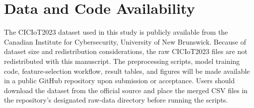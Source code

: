 \documentclass[journal]{IEEEtran}
\begin{document}
\section*{Data and Code Availability}
The CICIoT2023 dataset used in this study is publicly available from the Canadian Institute for Cybersecurity, University of New Brunswick. Because of dataset size and redistribution considerations, the raw CICIoT2023 files are not redistributed with this manuscript. The preprocessing scripts, model training code, feature-selection workflow, result tables, and figures will be made available in a public GitHub repository upon submission or acceptance. Users should download the dataset from the official source and place the merged CSV files in the repository's designated raw-data directory before running the scripts.



\end{document}
